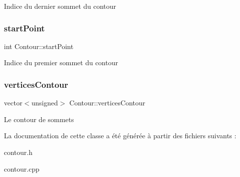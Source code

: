 Indice du dernier sommet du contour \mbox{\label{classContour_a2f694889bf420b8fabd7ecc2fbd7608d}} 
\subsubsection{\texorpdfstring{start\+Point}{startPoint}}
{\footnotesize\ttfamily int Contour\+::start\+Point\hspace{0.3cm}{\ttfamily [protected]}}

Indice du premier sommet du contour \mbox{\label{classContour_a5e1351483caaec2b0b23287a012fbc56}} 
\subsubsection{\texorpdfstring{vertices\+Contour}{verticesContour}}
{\footnotesize\ttfamily vector$<$unsigned$>$ Contour\+::vertices\+Contour\hspace{0.3cm}{\ttfamily [protected]}}

Le contour de sommets 

La documentation de cette classe a été générée à partir des fichiers suivants \+:\begin{DoxyCompactItemize}
\item 
contour.\+h\item 
contour.\+cpp\end{DoxyCompactItemize}
